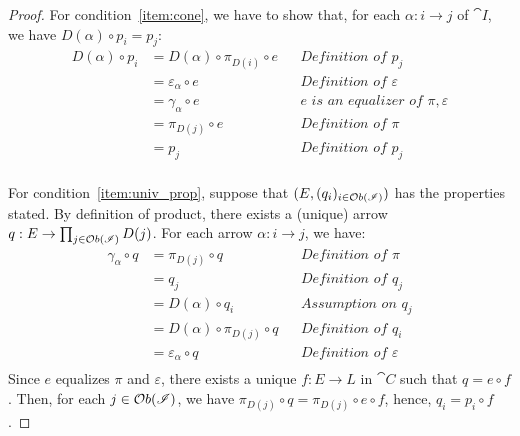 \documentclass[a4paper, twoside,openright]{report}
\theoremstyle{plain}
\theoremstyle{definition}
\begin{document}
\begin{proof}
    For condition~\ref{item:cone}, we have to show that, for each $\alpha : i \rightarrow j$ of $\cat I$, we have $D(\alpha) \circ p_i = p_j$:
    \begin{align*}
        D(\alpha) \circ p_i 
            &= D(\alpha) \circ \pi_{D(i)} \circ e   && \textit{Definition of $p_j$} \\
            &= \varepsilon_{\alpha} \circ e         && \textit{Definition of $\varepsilon$}\\
            &= \gamma_\alpha \circ e                && \textit{$e$ is an equalizer of $\pi, \varepsilon$}\\
            &= \pi_{D(j)} \circ e                   && \textit{Definition of $\pi$} \\
            &= p_j                                  && \textit{Definition of $p_j$} \\
    \end{align*}

    For condition~\ref{item:univ_prop}, suppose that $(E, (q_i)_{i \in \mathcal{O}b(\mathscr{I})})$ has the properties stated. By definition of product, there exists a (unique) arrow $q: E \rightarrow \prod_{j \in \mathcal{O}b(\mathscr{I})}D(j)$. For each arrow $\alpha: i \rightarrow j$, we have:
    \begin{align*}
            \gamma_\alpha \circ q 
                &= \pi_{D(j)} \circ q           && \textit{Definition of $\pi$} \\
                &= q_j                          && \textit{Definition of $q_j$} \\
                &= D(\alpha) \circ q_i          && \textit{Assumption on $q_j$} \\
                &= D(\alpha) \circ \pi_{D(j)} \circ q   &&\textit{Definition of $q_i$} \\
                &= \varepsilon_{\alpha} \circ q && \textit{Definition of $\varepsilon$} \\
    \end{align*}
    Since $e$ equalizes $\pi$ and $\varepsilon$, there exists a unique $f: E \rightarrow L$ in $\cat C$ such that $q = e \circ f$. Then, for each $j \in \mathcal{O}b(\mathscr{I})$, we have $\pi_{D(j)} \circ q = \pi_{D(j)} \circ e \circ f$, hence, $q_i = p_i \circ f$.
\end{proof}



 		


\end{document}
